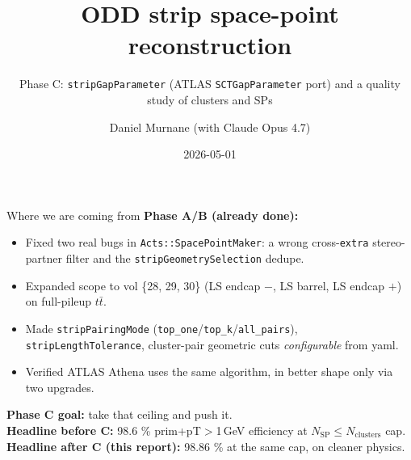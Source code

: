 \documentclass[aspectratio=169,10pt]{beamer}
\title{ODD strip space-point reconstruction}
\subtitle{Phase C: \texttt{stripGapParameter} (ATLAS \texttt{SCTGapParameter} port) and a quality study of clusters and SPs}
\date{2026-05-01}
\author{Daniel Murnane (with Claude Opus 4.7)}
\institute{ColliderML / ExaTrkX}
\newcommand{\ttbar}{$t\bar t$\xspace}
\begin{document}
\maketitle

\begin{frame}{Where we are coming from}
\textbf{Phase A/B (already done):}
\begin{itemize}
  \item Fixed two real bugs in \texttt{Acts::SpacePointMaker}:
    a wrong cross-\texttt{extra} stereo-partner filter and the \texttt{stripGeometrySelection} dedupe.
  \item Expanded scope to vol \{28, 29, 30\} (LS endcap $-$, LS barrel, LS endcap $+$) on full-pileup \ttbar.
  \item Made \texttt{stripPairingMode} (\texttt{top\_one}/\texttt{top\_k}/\texttt{all\_pairs}), \texttt{stripLengthTolerance},
    cluster-pair geometric cuts \emph{configurable} from yaml.
  \item \alert{Verified ATLAS Athena uses the same algorithm, in better shape only via two upgrades.}
\end{itemize}

\textbf{Phase C goal:} take that ceiling and push it.\\[1ex]
\textbf{Headline before C:} 98.6 \% prim+pT$>$1\,GeV efficiency at $N_\mathrm{SP} \le N_\mathrm{clusters}$ cap.\\
\textbf{Headline after C (this report):} \alert{98.86 \%} at the same cap, on cleaner physics.

\end{frame}
\end{document}
